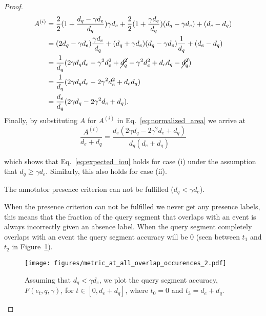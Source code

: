 \begin{proof}
\begin{align*}
A^{(i)} &= \frac{2}{2}(1+\frac{d_q-\gamma d_e}{d_q})\gamma d_e
+ \frac{2}{2}(1 + \frac{\gamma d_e}{d_q})(d_q - \gamma d_e)
+ (d_e - d_q) \\
&= (2d_q - \gamma d_e)\frac{\gamma d_e}{d_q} + (d_q + \gamma d_e)(d_q - \gamma d_e)\frac{1}{d_q} + (d_e - d_q) \\
&= \frac{1}{d_q}(2\gamma d_q d_e - \gamma^2 d_e^2 + \cancel{d_q^2} - \gamma^2 d_e^2 + d_e d_q - \cancel{d_q^2}) \\
&= \frac{1}{d_q}(2\gamma d_q d_e - 2\gamma^2 d_e^2 + d_e d_q) \\
&= \frac{d_e}{d_q}(2\gamma d_q - 2\gamma^2 d_e + d_q).
\end{align*}
Finally, by substituting $A$ for $A^{(i)}$ in Eq.~\ref{eq:normalized_area} we arrive at
\begin{equation}
    \frac{A^{(i)}}{d_e + d_q} = \frac{d_e(2\gamma d_q - 2\gamma^2 d_e + d_q)}{d_q(d_e + d_q)}
\end{equation}

which shows that Eq.~\ref{eq:expected_iou} holds for case (i) under the assumption that $d_q \geq \gamma d_e$. Similarly, this also holds for case (ii).


\begin{assumption}
    The annotator presence criterion can not be fulfilled ($d_q < \gamma d_e$).
\end{assumption}

When the presence criterion can not be fulfilled we never get any presence labels, this means that the fraction of the query segment that overlaps with an event is always incorrectly given an absence label. When the query segment completely overlaps with an event the query segment accuracy will be $0$ (seen between $t_1$ and $t_2$ in Figure~\ref{fig:query_segment_accuracy_2}).

\begin{figure}[H]
    \centering
    \texttt{[image: figures/metric\_at\_all\_overlap\_occurences\_2.pdf]}
    \caption{Assuming that $d_q < \gamma d_e$, we plot the query segment accuracy, $F(e_t, q, \gamma)$, for $t\in [0, d_e + d_q]$, where $t_0 = 0$ and $t_3 = d_e + d_q$.}
    \label{fig:query_segment_accuracy_2}
\end{figure}


\end{proof}
